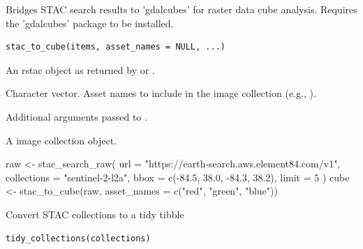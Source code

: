 \documentclass[a4paper]{book}
\begin{document}
%
\begin{Description}
Bridges STAC search results to 'gdalcubes' for raster data cube analysis.
Requires the 'gdalcubes' package to be installed.
\end{Description}
%
\begin{Usage}
\begin{verbatim}
stac_to_cube(items, asset_names = NULL, ...)
\end{verbatim}
\end{Usage}
%
\begin{Arguments}
\begin{ldescription}
\item[\code{items}] An rstac  object as returned by 
or .

\item[\code{asset\_names}] Character vector. Asset names to include in the
image collection (e.g., ).

\item[\code{...}] Additional arguments passed to
.
\end{ldescription}
\end{Arguments}
%
\begin{Value}
A  image collection object.
\end{Value}
%
\begin{Examples}
\begin{ExampleCode}


raw <- stac_search_raw(
  url = "https://earth-search.aws.element84.com/v1",
  collections = "sentinel-2-l2a",
  bbox = c(-84.5, 38.0, -84.3, 38.2),
  limit = 5
)
cube <- stac_to_cube(raw, asset_names = c("red", "green", "blue"))


\end{ExampleCode}
\end{Examples}
%
\begin{Description}
Convert STAC collections to a tidy tibble
\end{Description}
%
\begin{Usage}
\begin{verbatim}
tidy_collections(collections)
\end{verbatim}
\end{Usage}
\end{document}
